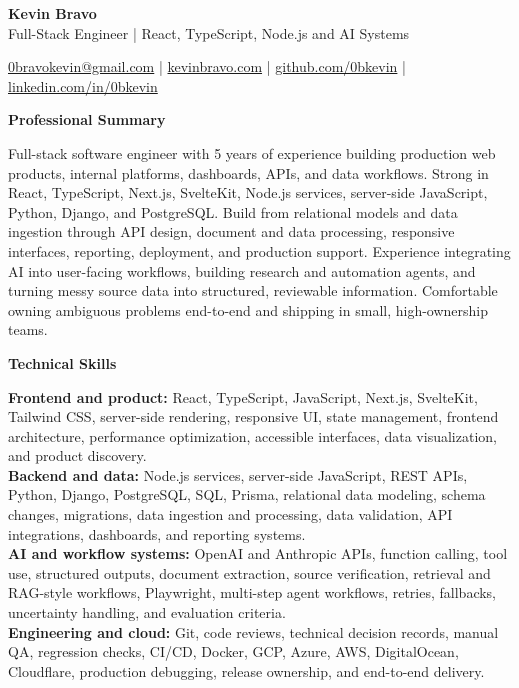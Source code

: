 \documentclass[10pt]{article}
\newcommand{\sectiontitle}[1]{%
    \vspace{4pt}
    \begin{center}
        \textbf{#1}
    \end{center}
    \vspace{-5pt}
}
\begin{document}
\raggedright

\begin{center}
    {\LARGE \textbf{Kevin Bravo}}\\
    Full-Stack Engineer | React, TypeScript, Node.js and AI Systems \\
    \hrulefill
\end{center}

\begin{center}
    \href{mailto:0bravokevin@gmail.com}{0bravokevin@gmail.com}
    | \href{https://kevinbravo.com}{kevinbravo.com}
    | \href{https://github.com/0bkevin}{github.com/0bkevin}
    | \href{https://www.linkedin.com/in/0bkevin}{linkedin.com/in/0bkevin}
\end{center}

\fontsize{9.35}{10.2}\selectfont

\sectiontitle{Professional Summary}
Full-stack software engineer with 5 years of experience building production web products, internal platforms, dashboards, APIs, and data workflows. Strong in React, TypeScript, Next.js, SvelteKit, Node.js services, server-side JavaScript, Python, Django, and PostgreSQL. Build from relational models and data ingestion through API design, document and data processing, responsive interfaces, reporting, deployment, and production support. Experience integrating AI into user-facing workflows, building research and automation agents, and turning messy source data into structured, reviewable information. Comfortable owning ambiguous problems end-to-end and shipping in small, high-ownership teams.

\sectiontitle{Technical Skills}
\textbf{Frontend and product:} React, TypeScript, JavaScript, Next.js, SvelteKit, Tailwind CSS, server-side rendering, responsive UI, state management, frontend architecture, performance optimization, accessible interfaces, data visualization, and product discovery. \\
\textbf{Backend and data:} Node.js services, server-side JavaScript, REST APIs, Python, Django, PostgreSQL, SQL, Prisma, relational data modeling, schema changes, migrations, data ingestion and processing, data validation, API integrations, dashboards, and reporting systems. \\
\textbf{AI and workflow systems:} OpenAI and Anthropic APIs, function calling, tool use, structured outputs, document extraction, source verification, retrieval and RAG-style workflows, Playwright, multi-step agent workflows, retries, fallbacks, uncertainty handling, and evaluation criteria. \\
\textbf{Engineering and cloud:} Git, code reviews, technical decision records, manual QA, regression checks, CI/CD, Docker, GCP, Azure, AWS, DigitalOcean, Cloudflare, production debugging, release ownership, and end-to-end delivery.
\end{document}
